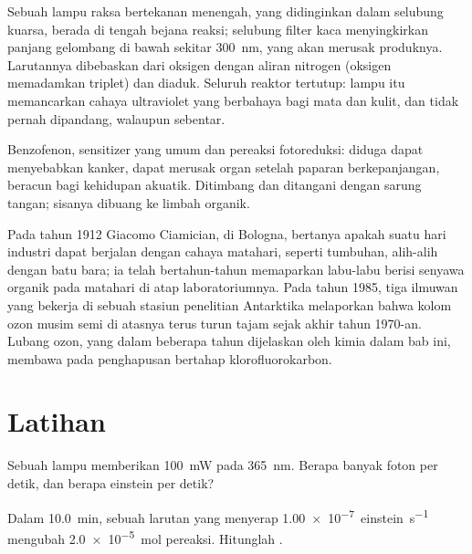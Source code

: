 \begin{inthelab}
Sebuah lampu raksa bertekanan menengah, yang didinginkan dalam selubung kuarsa,
berada di tengah bejana reaksi; selubung filter kaca menyingkirkan panjang
gelombang di bawah sekitar \qty{300}{nm}, yang akan merusak produknya.
Larutannya dibebaskan dari oksigen dengan aliran nitrogen (oksigen memadamkan
triplet) dan diaduk. Seluruh reaktor tertutup: lampu itu memancarkan cahaya
ultraviolet yang berbahaya bagi mata dan kulit, dan tidak pernah dipandang,
walaupun sebentar.
\end{inthelab}

\begin{safety}{}
Benzofenon, sensitizer yang umum dan pereaksi fotoreduksi: diduga dapat
menyebabkan kanker, dapat merusak organ setelah paparan berkepanjangan,
beracun bagi kehidupan akuatik. Ditimbang dan ditangani dengan sarung
tangan; sisanya dibuang ke limbah organik.
\end{safety}

\begin{history}
Pada tahun 1912 Giacomo Ciamician, di Bologna, bertanya apakah suatu hari
industri dapat berjalan dengan cahaya matahari, seperti tumbuhan, alih-alih
dengan batu bara; ia telah bertahun-tahun memaparkan labu-labu berisi senyawa
organik pada matahari di atap laboratoriumnya. Pada tahun 1985, tiga ilmuwan
yang bekerja di sebuah stasiun penelitian Antarktika melaporkan bahwa kolom
ozon musim semi di atasnya terus turun tajam sejak akhir tahun 1970-an.
Lubang ozon, yang dalam beberapa tahun dijelaskan oleh kimia dalam bab ini,
membawa pada penghapusan bertahap klorofluorokarbon.
\end{history}

\section{Latihan}

\begin{exercise}[$\star$]\label{exo:b3:photochemistry:1}
Sebuah lampu memberikan \qty{100}{mW} pada \qty{365}{nm}. Berapa banyak foton per
detik, dan berapa einstein per detik?
\end{exercise}

\begin{exercise}[$\star$]\label{exo:b3:photochemistry:2}
Dalam \qty{10.0}{min}, sebuah larutan yang menyerap
\qty{1.00e-7}{einstein.s^{-1}} mengubah \qty{2.0e-5}{mol} pereaksi. Hitunglah
.
\end{exercise}


